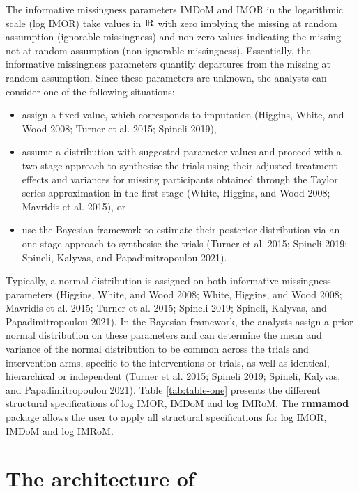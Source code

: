 The informative missingness parameters IMDoM and IMOR in the logarithmic scale
(log IMOR) take values in \({\rm I\!R}\) with zero implying the missing at random
assumption (ignorable missingness) and non-zero values indicating the missing not
at random assumption (non-ignorable missingness). Essentially, the informative
missingness parameters quantify departures from the missing at random assumption.
Since these parameters are unknown, the analysts can consider one of the following
situations:

\begin{itemize}
\tightlist
\item
  assign a fixed value, which corresponds to imputation (Higgins, White, and Wood 2008; Turner et al. 2015; Spineli 2019),
\item
  assume a distribution with suggested parameter values and proceed with a two-stage
  approach to synthesise the trials using their adjusted treatment effects and variances
  for missing participants obtained through the Taylor series approximation in the
  first stage (White, Higgins, and Wood 2008; Mavridis et al. 2015), or
\item
  use the Bayesian framework to estimate their posterior distribution via an one-stage
  approach to synthesise the trials (Turner et al. 2015; Spineli 2019; Spineli, Kalyvas, and Papadimitropoulou 2021).
\end{itemize}

Typically, a normal distribution is assigned on both informative missingness parameters
(Higgins, White, and Wood 2008; White, Higgins, and Wood 2008; Mavridis et al. 2015; Turner et al. 2015; Spineli 2019; Spineli, Kalyvas, and Papadimitropoulou 2021).
In the Bayesian framework, the analysts assign a prior normal distribution on these
parameters and can determine the mean and variance of the normal distribution to
be common across the trials and intervention arms, specific to the interventions or
trials, as well as identical, hierarchical or independent (Turner et al. 2015; Spineli 2019; Spineli, Kalyvas, and Papadimitropoulou 2021). Table
\ref{tab:table-one} presents the different structural specifications of
log IMOR, IMDoM and log IMRoM. The \textbf{rnmamod} package allows the user to apply
all structural specifications for log IMOR, IMDoM and log IMRoM.

\hypertarget{the-architecture-of}{%
\section{\texorpdfstring{The architecture of }{The architecture of }}\label{the-architecture-of}}

